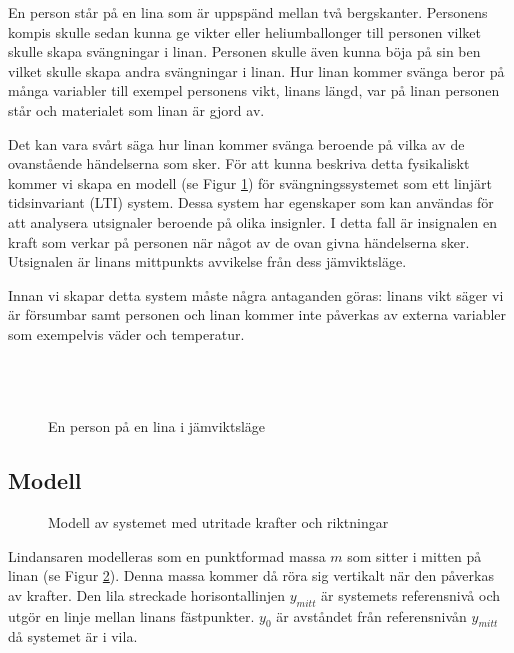 En person står på en lina som är uppspänd mellan två bergskanter.
Personens kompis skulle sedan kunna ge vikter eller heliumballonger till personen vilket skulle skapa svängningar i linan.
Personen skulle även kunna böja på sin ben vilket skulle skapa andra svängningar i linan.
Hur linan kommer svänga beror på många variabler till exempel personens vikt, linans längd, var på linan personen står och materialet som linan är gjord av. 

Det kan vara svårt säga hur linan kommer svänga beroende på vilka av de ovanstående händelserna som sker.
För att kunna beskriva detta fysikaliskt kommer vi skapa en modell (se Figur \ref{fig:skiss}) 
för svängningssystemet som ett linjärt tidsinvariant (LTI) system. 
Dessa system har egenskaper som kan användas för att analysera utsignaler beroende på
olika insignler. 
I detta fall är insignalen en kraft som verkar på personen när något av de ovan givna händelserna sker.
Utsignalen är linans mittpunkts avvikelse från dess jämviktsläge.

Innan vi skapar detta system måste några antaganden göras: linans vikt säger vi är försumbar samt personen och linan kommer inte påverkas av externa variabler som exempelvis väder och temperatur. 
\\\\\\\\
\begin{figure}[h] %
    \centering
    \scalebox{1.2}{}
    \caption{En person på en lina i jämviktsläge}    
    \label{fig:skiss}
\end{figure}

\newpage\subsection{Modell}

\begin{figure}[h] %
    \centering
    
    \caption{Modell av systemet med utritade krafter och riktningar}
    \label{fig:modell}
\end{figure}

Lindansaren modelleras som en punktformad massa $m$ som sitter i mitten på linan (se Figur \ref{fig:modell}). 
Denna massa kommer då röra sig vertikalt när den påverkas av krafter.
Den lila streckade horisontallinjen $y_{mitt}$ är systemets referensnivå och utgör en linje mellan linans fästpunkter. $y_0$ är avståndet från referensnivån $y_{mitt}$ då systemet är i vila.

